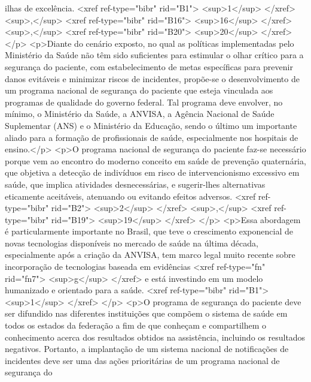         ilhas de excelência. <xref ref-type="bibr" rid="B1">
          <sup>1</sup>
        </xref>
        <sup>,</sup>
        <xref ref-type="bibr" rid="B16">
          <sup>16</sup>
        </xref>
        <sup>,</sup>
        <xref ref-type="bibr" rid="B20">
          <sup>20</sup>
        </xref>
      </p>
      <p>Diante do cenário exposto, no qual as políticas implementadas pelo Ministério da Saúde não
        têm sido suficientes para estimular o olhar crítico para a segurança do paciente, com
        estabelecimento de metas específicas para prevenir danos evitáveis e minimizar riscos de
        incidentes, propõe-se o desenvolvimento de um programa nacional de segurança do paciente que
        esteja vinculada aos programas de qualidade do governo federal. Tal programa deve envolver,
        no mínimo, o Ministério da Saúde, a ANVISA, a Agência Nacional de Saúde Suplementar (ANS) e
        o Ministério da Educação, sendo o último um importante aliado para a formação de
        profissionais de saúde, especialmente nos hospitais de ensino.</p>
      <p>O programa nacional de segurança do paciente faz-se necessário porque vem ao encontro do
        moderno conceito em saúde de prevenção quaternária, que objetiva a detecção de indivíduos em
        risco de intervencionismo excessivo em saúde, que implica atividades desnecessárias, e
        sugerir-lhes alternativas eticamente aceitáveis, atenuando ou evitando efeitos adversos.
          <xref ref-type="bibr" rid="B2">
          <sup>2</sup>
        </xref>
        <sup>,</sup>
        <xref ref-type="bibr" rid="B19">
          <sup>19</sup>
        </xref>
      </p>
      <p>Essa abordagem é particularmente importante no Brasil, que teve o crescimento exponencial
        de novas tecnologias disponíveis no mercado de saúde na última década, especialmente após a
        criação da ANVISA, tem marco legal muito recente sobre incorporação de tecnologias baseada
        em evidências <xref ref-type="fn" rid="fn7">
          <sup>g</sup>
        </xref> e está investindo em um modelo humanizado e orientado para a saúde. <xref
          ref-type="bibr" rid="B1">
          <sup>1</sup>
        </xref>
      </p>
      <p>O programa de segurança do paciente deve ser difundido nas diferentes instituições que
        compõem o sistema de saúde em todos os estados da federação a fim de que conheçam e
        compartilhem o conhecimento acerca dos resultados obtidos na assistência, incluindo os
        resultados negativos. Portanto, a implantação de um sistema nacional de notificações de
        incidentes deve ser uma das ações prioritárias de um programa nacional de segurança do
